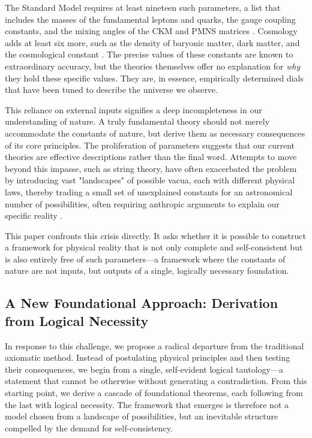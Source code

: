The Standard Model requires at least nineteen such parameters, a list that includes the masses of the fundamental leptons and quarks, the gauge coupling constants, and the mixing angles of the CKM and PMNS matrices \parencite{PDG2024, Zyla2022}. Cosmology adds at least six more, such as the density of baryonic matter, dark matter, and the cosmological constant \parencite{Planck2018}. The precise values of these constants are known to extraordinary accuracy, but the theories themselves offer no explanation for \textit{why} they hold these specific values. They are, in essence, empirically determined dials that have been tuned to describe the universe we observe.

This reliance on external inputs signifies a deep incompleteness in our understanding of nature. A truly fundamental theory should not merely accommodate the constants of nature, but derive them as necessary consequences of its core principles. The proliferation of parameters suggests that our current theories are effective descriptions rather than the final word. Attempts to move beyond this impasse, such as string theory, have often exacerbated the problem by introducing vast "landscapes" of possible vacua, each with different physical laws, thereby trading a small set of unexplained constants for an astronomical number of possibilities, often requiring anthropic arguments to explain our specific reality \parencite{Susskind2003, Weinberg1987}.

This paper confronts this crisis directly. It asks whether it is possible to construct a framework for physical reality that is not only complete and self-consistent but is also entirely free of such parameters—a framework where the constants of nature are not inputs, but outputs of a single, logically necessary foundation.

\subsection{A New Foundational Approach: Derivation from Logical Necessity}
In response to this challenge, we propose a radical departure from the traditional axiomatic method. Instead of postulating physical principles and then testing their consequences, we begin from a single, self-evident logical tautology—a statement that cannot be otherwise without generating a contradiction. From this starting point, we derive a cascade of foundational theorems, each following from the last with logical necessity. The framework that emerges is therefore not a model chosen from a landscape of possibilities, but an inevitable structure compelled by the demand for self-consistency.

